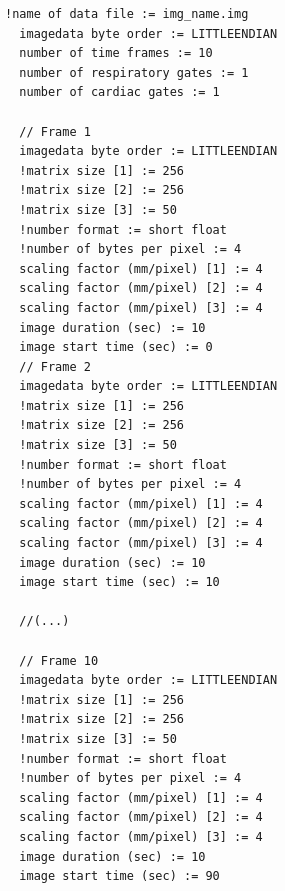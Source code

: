 \documentclass[a4paper, 11pt]{article}
\begin{document}
\begin{lstlisting}[label={intfMerge4D},caption= Interfile header of a dynamic image]
  !name of data file := img_name.img
  imagedata byte order := LITTLEENDIAN
  number of time frames := 10
  number of respiratory gates := 1
  number of cardiac gates := 1

  // Frame 1 
  imagedata byte order := LITTLEENDIAN
  !matrix size [1] := 256
  !matrix size [2] := 256
  !matrix size [3] := 50
  !number format := short float
  !number of bytes per pixel := 4
  scaling factor (mm/pixel) [1] := 4
  scaling factor (mm/pixel) [2] := 4
  scaling factor (mm/pixel) [3] := 4
  image duration (sec) := 10
  image start time (sec) := 0
  // Frame 2 
  imagedata byte order := LITTLEENDIAN
  !matrix size [1] := 256
  !matrix size [2] := 256
  !matrix size [3] := 50
  !number format := short float
  !number of bytes per pixel := 4
  scaling factor (mm/pixel) [1] := 4
  scaling factor (mm/pixel) [2] := 4
  scaling factor (mm/pixel) [3] := 4
  image duration (sec) := 10
  image start time (sec) := 10

  //(...)

  // Frame 10
  imagedata byte order := LITTLEENDIAN
  !matrix size [1] := 256
  !matrix size [2] := 256
  !matrix size [3] := 50
  !number format := short float
  !number of bytes per pixel := 4
  scaling factor (mm/pixel) [1] := 4
  scaling factor (mm/pixel) [2] := 4
  scaling factor (mm/pixel) [3] := 4
  image duration (sec) := 10
  image start time (sec) := 90
\end{lstlisting}


\newpage
\end{document}
